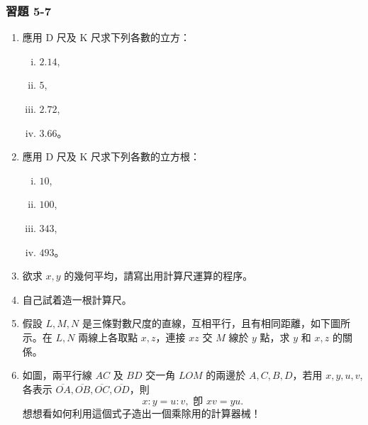 \subsubsection*{習題 5-7}
\begin{enumerate}
    \item 應用 D 尺及 K 尺求下列各數的立方：
    \begin{enumerate}[(i)]
        \item $2.14$,
        \item $5$,
        \item $2.72$,
        \item $3.66$。
    \end{enumerate}
    \item 應用 D 尺及 K 尺求下列各數的立方根：
    \begin{enumerate}[(i)]
        \item $10$,
        \item $100$,
        \item $343$,
        \item $493$。
    \end{enumerate}
    \item 欲求 $x, y$ 的幾何平均，請寫出用計算尺運算的程序。
    \item 自己試着造一根計算尺。
    \item 假設 $L, M, N$ 是三條對數尺度的直線，互相平行，且有相同距離，如下圖所示。在 $L, N$ 兩線上各取點 $x, z$，連接 $xz$ 交 $M$ 線於 $y$ 點，求 $y$ 和 $x, z$ 的關係。
    
    \begin{center}
    \end{center}
    
    \item 如圖，兩平行線 $AC$ 及 $BD$ 交一角 $LOM$ 的兩邊於 $A, C, B, D$，若用 $x, y, u, v$, 各表示 $\overline{OA}, \overline{OB}, \overline{OC}, \overline{OD}$，則
    \[
    x : y = u : v, \text{ 卽 } xv = yu.
    \]
    想想看如何利用這個式子造出一個乘除用的計算器械！
    

\end{enumerate}
